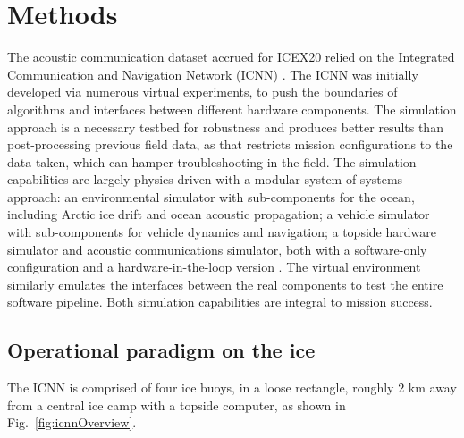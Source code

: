 \section{Methods}
\label{sec:methods}

The acoustic communication dataset accrued for ICEX20 relied on the Integrated Communication and Navigation Network (ICNN) \citep{schneider_self-adapting_2020,randeni_construction_2020,randeni_high-resolution_2021}.
The ICNN was initially developed via numerous virtual experiments, to push the boundaries of algorithms and interfaces between different hardware components.
The simulation approach is a necessary testbed for robustness and produces better results than post-processing previous field data, as that restricts mission configurations to the data taken, which can hamper troubleshooting in the field.
The simulation capabilities are largely physics-driven with a modular system of systems approach: an environmental simulator with sub-components for the ocean, including Arctic ice drift and ocean acoustic propagation; a vehicle simulator with sub-components for vehicle dynamics and navigation; a topside hardware simulator and acoustic communications simulator, both with a software-only configuration and a hardware-in-the-loop version \citep{schneider_netsim_2018}.
The virtual environment similarly emulates the interfaces between the real components to test the entire software pipeline.
Both simulation capabilities are integral to mission success.

\subsection{Operational paradigm on the ice}

The ICNN is comprised of four ice buoys, in a loose rectangle, roughly 2 km away from a central ice camp with a topside computer, as shown in Fig.~\ref{fig:icnnOverview}.

